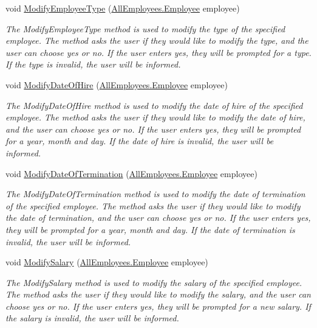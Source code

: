 \begin{DoxyCompactItemize}
void \hyperlink{class_the_company_1_1_container_a6acf243566f6ef9fddbd7e5487bae64a}{Modify\+Employee\+Type} (\hyperlink{class_all_employees_1_1_employee}{All\+Employees.\+Employee} employee)
\begin{DoxyCompactList}\small\item\em The Modify\+Employee\+Type method is used to modify the type of the specified employee. The method asks the user if they would like to modify the type, and the user can choose yes or no. If the user enters yes, they will be prompted for a type. If the type is invalid, the user will be informed. \end{DoxyCompactList}\item 
void \hyperlink{class_the_company_1_1_container_a71dabc365c2d76f2d491a97cae615c7d}{Modify\+Date\+Of\+Hire} (\hyperlink{class_all_employees_1_1_employee}{All\+Employees.\+Employee} employee)
\begin{DoxyCompactList}\small\item\em The Modify\+Date\+Of\+Hire method is used to modify the date of hire of the specified employee. The method asks the user if they would like to modify the date of hire, and the user can choose yes or no. If the user enters yes, they will be prompted for a year, month and day. If the date of hire is invalid, the user will be informed. \end{DoxyCompactList}\item 
void \hyperlink{class_the_company_1_1_container_a2f5a129db55aa8d785ccfa6835ad3f29}{Modify\+Date\+Of\+Termination} (\hyperlink{class_all_employees_1_1_employee}{All\+Employees.\+Employee} employee)
\begin{DoxyCompactList}\small\item\em The Modify\+Date\+Of\+Termination method is used to modify the date of termination of the specified employee. The method asks the user if they would like to modify the date of termination, and the user can choose yes or no. If the user enters yes, they will be prompted for a year, month and day. If the date of termination is invalid, the user will be informed. \end{DoxyCompactList}\item 
void \hyperlink{class_the_company_1_1_container_a84f82419fadc0bf39f1bc7622b23f39b}{Modify\+Salary} (\hyperlink{class_all_employees_1_1_employee}{All\+Employees.\+Employee} employee)
\begin{DoxyCompactList}\small\item\em The Modify\+Salary method is used to modify the salary of the specified employee. The method asks the user if they would like to modify the salary, and the user can choose yes or no. If the user enters yes, they will be prompted for a new salary. If the salary is invalid, the user will be informed. \end{DoxyCompactList}\item 

\end{DoxyCompactItemize}
